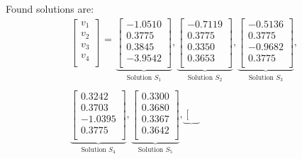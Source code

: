 \documentclass[journal,twocolumn]{IEEEtran}
\begin{document}
 Found solutions are:
{\tiny
\begin{displaymath}
\begin{array}{r}
\left[\begin{array}{r}
v_1 \\ v_2  \\ v_3  \\ v_4  \\
\end{array}\right]
\begin{array}{r}
 \\ = \\ \\ \end{array}
\underbrace{\left[\begin{array}{r}
-1.0510 \\ 0.3775 \\  0.3845\\  -3.9542 \\
\end{array}\right]}_{\mbox{Solution $S_1$}},
\underbrace{\left[\begin{array}{r}
-0.7119\\0.3775\\ 0.3350\\ 0.3653 \\ 
\end{array}\right]}_{\mbox{Solution $S_2$}},
\underbrace{\left[\begin{array}{r}
-0.5136\\0.3775\\-0.9682\\0.3775\\
\end{array}\right]}_{\mbox{Solution $S_3$}}, \\\\
\underbrace{\left[\begin{array}{r}
0.3242\\0.3703\\ -1.0395\\0.3775 \\
\end{array}\right]}_{\mbox{Solution $S_4$}},
\underbrace{\left[\begin{array}{r}
0.3300 \\ 0.3680 \\ 0.3367 \\ 0.3642 \\
\end{array}\right]}_{\mbox{Solution $S_5$}},
\underbrace{\left[\begin{array}{r}

\end{array}}
\end{array}
\end{displaymath}}
\end{document}
